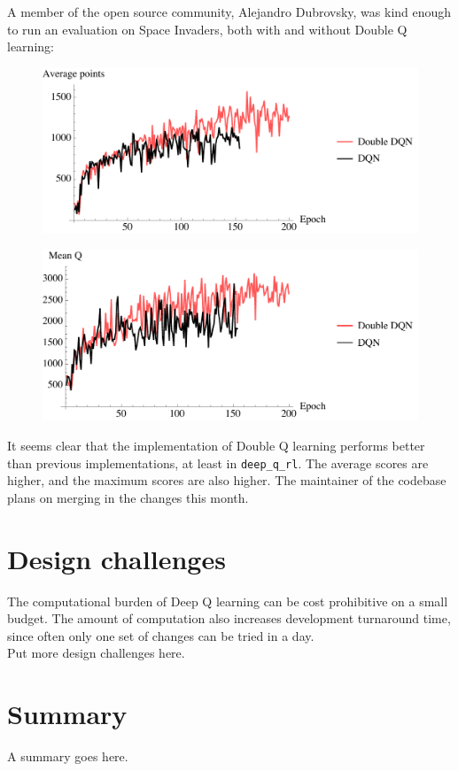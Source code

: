 \documentclass{article}
\begin{document}
  A member of the open source community, Alejandro Dubrovsky, was kind enough to run an evaluation on Space Invaders, both with and without Double Q learning:
  \begin{figure}[H]
    \centering
    \includegraphics[width=120mm]{dqn_si_rewardper.pdf}
  \end{figure}
  \begin{figure}[H]
    \centering
    \includegraphics[width=120mm]{dqn_si_meanq.pdf}
  \end{figure}
  It seems clear that the implementation of Double Q learning performs better than previous implementations, at least in \texttt{deep\_q\_rl}. The average scores are higher, and the maximum scores are also higher. The maintainer of the codebase plans on merging in the changes this month.

\section{Design challenges}
The computational burden of Deep Q learning can be cost prohibitive on a small budget. The amount of computation also increases development turnaround time, since often only one set of changes can be tried in a day. \\

Put more design challenges here.

\section{Summary}
A summary goes here.
\end{document}
